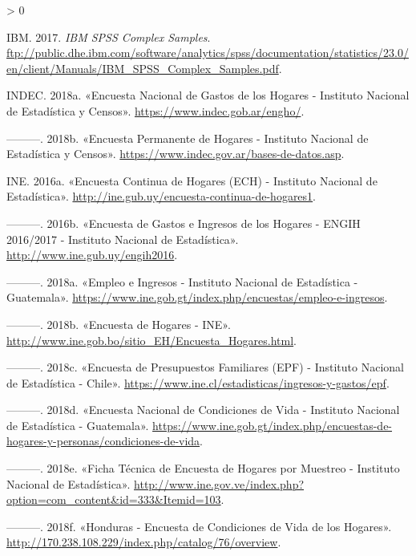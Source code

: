 \documentclass[
  12pt,
  spanish,
]{book}
\newlength{\cslhangindent}
\newenvironment{CSLReferences}[2] %
 {%
  \setlength{\parindent}{0pt}
  \ifodd #1 \everypar{\setlength{\hangindent}{\cslhangindent}}\ignorespaces\fi
  \ifnum #2 > 0
  \setlength{\parskip}{#2\baselineskip}
  \fi
 }%
 {}
\begin{document}
\begin{CSLReferences}{1}{0}
\leavevmode\hypertarget{ref-IBM_2017}{}%
IBM. 2017. \emph{IBM SPSS Complex Samples}. \url{ftp://public.dhe.ibm.com/software/analytics/spss/documentation/statistics/23.0/en/client/Manuals/IBM_SPSS_Complex_Samples.pdf}.

\leavevmode\hypertarget{ref-INDEC-AR2}{}%
INDEC. 2018a. {«Encuesta Nacional de Gastos de los Hogares - Instituto Nacional de Estadística y Censos»}. \url{https://www.indec.gob.ar/engho/}.

\leavevmode\hypertarget{ref-INDEC-AR}{}%
---------. 2018b. {«Encuesta Permanente de Hogares - Instituto Nacional de Estadística y Censos»}. \url{https://www.indec.gov.ar/bases-de-datos.asp}.

\leavevmode\hypertarget{ref-INE-UY_2016}{}%
INE. 2016a. {«Encuesta Continua de Hogares (ECH) - Instituto Nacional de Estadística»}. \url{http://ine.gub.uy/encuesta-continua-de-hogares1}.

\leavevmode\hypertarget{ref-INE2-UY}{}%
---------. 2016b. {«Encuesta de Gastos e Ingresos de los Hogares - ENGIH 2016/2017 - Instituto Nacional de Estadística»}. \url{http://www.ine.gub.uy/engih2016}.

\leavevmode\hypertarget{ref-INE-GT}{}%
---------. 2018a. {«Empleo e Ingresos - Instituto Nacional de Estadística - Guatemala»}. \url{https://www.ine.gob.gt/index.php/encuestas/empleo-e-ingresos}.

\leavevmode\hypertarget{ref-INE-BO}{}%
---------. 2018b. {«Encuesta de Hogares - INE»}. \url{http://www.ine.gob.bo/sitio_EH/Encuesta_Hogares.html}.

\leavevmode\hypertarget{ref-INE_CL}{}%
---------. 2018c. {«Encuesta de Presupuestos Familiares (EPF) - Instituto Nacional de Estadística - Chile»}. \url{https://www.ine.cl/estadisticas/ingresos-y-gastos/epf}.

\leavevmode\hypertarget{ref-INE2-GT}{}%
---------. 2018d. {«Encuesta Nacional de Condiciones de Vida - Instituto Nacional de Estadística - Guatemala»}. \url{https://www.ine.gob.gt/index.php/encuestas-de-hogares-y-personas/condiciones-de-vida}.

\leavevmode\hypertarget{ref-INE-VE}{}%
---------. 2018e. {«Ficha Técnica de Encuesta de Hogares por Muestreo - Instituto Nacional de Estadística»}. \url{http://www.ine.gov.ve/index.php?option=com_content\&id=333\&Itemid=103}.

\leavevmode\hypertarget{ref-INE2-HN}{}%
---------. 2018f. {«Honduras - Encuesta de Condiciones de Vida de los Hogares»}. \url{http://170.238.108.229/index.php/catalog/76/overview}.


\end{CSLReferences}
\end{document}
